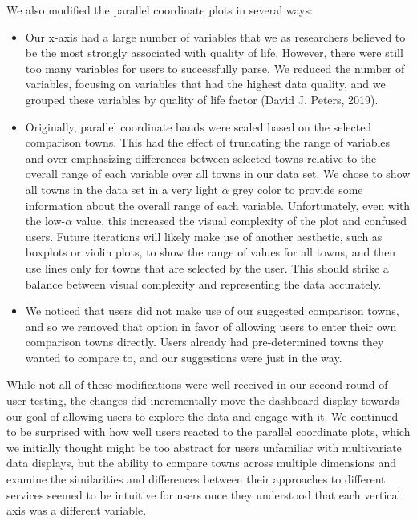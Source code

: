 \documentclass[print]{nuthesis}
\providecommand{\tightlist}{%
  \setlength{\itemsep}{0pt}\setlength{\parskip}{0pt}}
\begin{document}
We also modified the parallel coordinate plots in several ways:

\begin{itemize}
\tightlist
\item
  Our x-axis had a large number of variables that we as researchers believed to be the most strongly associated with quality of life. However, there were still too many variables for users to successfully parse. We reduced the number of variables, focusing on variables that had the highest data quality, and we grouped these variables by quality of life factor (David J. Peters, 2019).
\item
  Originally, parallel coordinate bands were scaled based on the selected comparison towns. This had the effect of truncating the range of variables and over-emphasizing differences between selected towns relative to the overall range of each variable over all towns in our data set. We chose to show all towns in the data set in a very light \(\alpha\) grey color to provide some information about the overall range of each variable. Unfortunately, even with the low-\(\alpha\) value, this increased the visual complexity of the plot and confused users. Future iterations will likely make use of another aesthetic, such as boxplots or violin plots, to show the range of values for all towns, and then use lines only for towns that are selected by the user. This should strike a balance between visual complexity and representing the data accurately.
\item
  We noticed that users did not make use of our suggested comparison towns, and so we removed that option in favor of allowing users to enter their own comparison towns directly. Users already had pre-determined towns they wanted to compare to, and our suggestions were just in the way.
\end{itemize}

While not all of these modifications were well received in our second round of user testing, the changes did incrementally move the dashboard display towards our goal of allowing users to explore the data and engage with it. We continued to be surprised with how well users reacted to the parallel coordinate plots, which we initially thought might be too abstract for users unfamiliar with multivariate data displays, but the ability to compare towns across multiple dimensions and examine the similarities and differences between their approaches to different services seemed to be intuitive for users once they understood that each vertical axis was a different variable.
\end{document}
